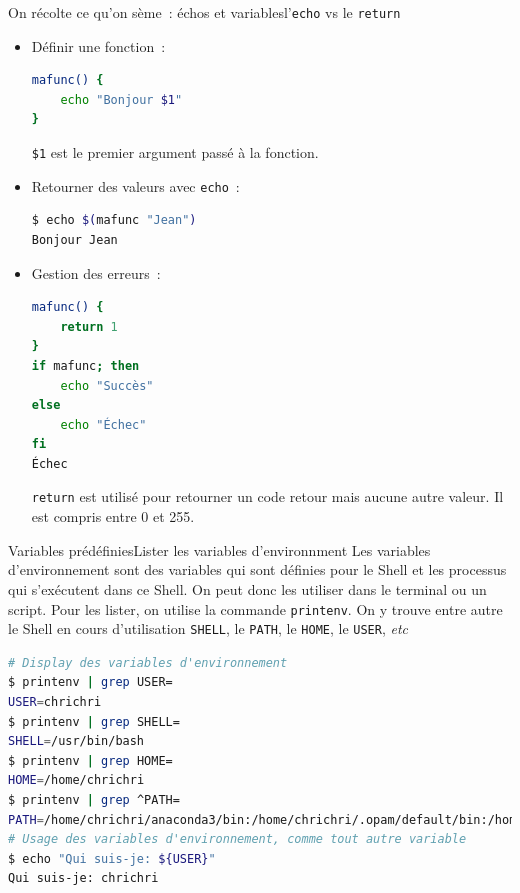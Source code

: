 \documentclass{beamer}
\begin{document}
    \begin{frame}[fragile]{On récolte ce qu'on sème~: échos et variables}{l'\lstinline{echo} vs le \lstinline{return}}
        \begin{itemize}
            \item Définir une fonction~:
            \begin{lstlisting}[language=bash,basicstyle=\ttfamily\tiny]
mafunc() {
    echo "Bonjour $1"
}
            \end{lstlisting}
            \lstinline{$1} est le premier argument passé à la fonction.
            \item Retourner des valeurs avec \lstinline{echo}~:
            \begin{lstlisting}[language=bash,basicstyle=\ttfamily\tiny]
$ echo $(mafunc "Jean")
Bonjour Jean
            \end{lstlisting}
            \item Gestion des erreurs~:
            \begin{lstlisting}[language=bash,basicstyle=\ttfamily\tiny]
mafunc() {
    return 1
}
if mafunc; then
    echo "Succès"
else
    echo "Échec"
fi
Échec
            \end{lstlisting}
            \lstinline{return} est utilisé pour retourner un code retour mais aucune autre valeur.
            Il est compris entre 0 et 255.
        \end{itemize}
    \end{frame}

    \begin{frame}[fragile]{Variables prédéfinies}{Lister les variables d'environnment}
        Les variables d'environnement sont des variables qui sont définies pour le Shell et les processus qui s'exécutent dans ce Shell.
        On peut donc les utiliser dans le terminal ou un script.
        \bigbreak
        Pour les lister, on utilise la commande \lstinline{printenv}.
        On y trouve entre autre le Shell en cours d'utilisation \lstinline{SHELL}, le \lstinline{PATH}, le \lstinline{HOME}, le \lstinline{USER}, \textit{etc}
        \begin{lstlisting}[language=bash,basicstyle=\tiny\ttfamily]
# Display des variables d'environnement
$ printenv | grep USER=
USER=chrichri
$ printenv | grep SHELL=
SHELL=/usr/bin/bash
$ printenv | grep HOME=
HOME=/home/chrichri
$ printenv | grep ^PATH=
PATH=/home/chrichri/anaconda3/bin:/home/chrichri/.opam/default/bin:/home/chrichri/.cargo/bin:/home/chrichri/.local/bin:/usr/local/sbin:/usr/local/bin:/usr/sbin:/usr/bin:/sbin:/bin:/usr/games:/usr/local/games:/snap/bin:/snap/bin:/home/chrichri/.dotnet/tools
# Usage des variables d'environnement, comme tout autre variable
$ echo "Qui suis-je: ${USER}"
Qui suis-je: chrichri
        \end{lstlisting}
    \end{frame}
\end{document}
